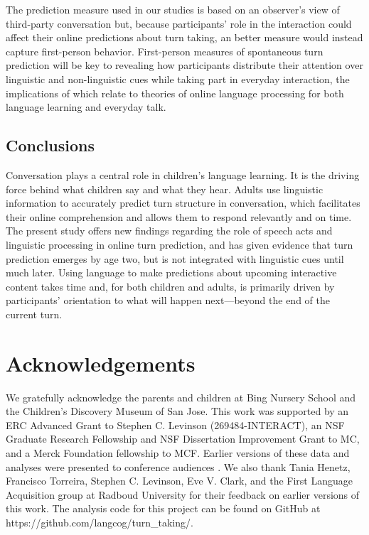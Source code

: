 \documentclass[authoryear, 12pt]{elsarticle}
\begin{document}
The prediction measure used in our studies is based on an observer's view of third-party conversation but, because participants' role in the interaction could affect their online predictions about turn taking, an better measure would instead capture first-person behavior. First-person measures of spontaneous turn prediction will be key to revealing how participants distribute their attention over linguistic and non-linguistic cues while taking part in everyday interaction, the implications of which relate to theories of online language processing for both language learning and everyday talk.

\subsection{Conclusions}

Conversation plays a central role in children's language learning. It is the driving force behind what children say and what they hear. Adults use linguistic information to accurately predict turn structure in conversation, which facilitates their online comprehension and allows them to respond relevantly and on time. The present study offers new findings regarding the role of speech acts and linguistic processing in online turn prediction, and has given evidence that turn prediction emerges by age two, but is not integrated with linguistic cues until much later. Using language to make predictions about upcoming interactive content takes time and, for both children and adults, is primarily driven by participants' orientation to what will happen next---beyond the end of the current turn.

\section*{Acknowledgements}

We gratefully acknowledge the parents and children at Bing Nursery School and the Children's Discovery Museum of San Jose. This work was supported by an ERC Advanced Grant to Stephen C. Levinson (269484-INTERACT), an NSF Graduate Research Fellowship and NSF Dissertation Improvement Grant to MC, and a Merck Foundation fellowship to MCF. Earlier versions of these data and analyses were presented to conference audiences \citep{casillas2012, casillas2013}. We also thank Tania Henetz, Francisco Torreira, Stephen C. Levinson, Eve V. Clark, and the First Language Acquisition group at Radboud University for their feedback on earlier versions of this work. The analysis code for this project can be found on GitHub at https://github.com/langcog/turn\_taking/.
\end{document}
